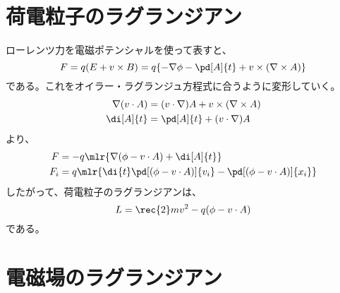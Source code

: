     \section{荷電粒子のラグランジアン}
        ローレンツ力を電磁ポテンシャルを使って表すと、
            \[F = q(E + v\times B) = q\{-\nabla\phi - \pd[A]{t} + v\times (\nabla \times A)\}\]
        である。これをオイラー・ラグランジュ方程式に合うように変形していく。
        \begin{align*}
            \nabla(v\cdot A) &= (v\cdot \nabla)A + v\times (\nabla \times A)\\
            \di[A]{t} &= \pd[A]{t} + (v\cdot \nabla)A\\
        \end{align*}
        より、
        \begin{align*}
            F &= -q\mlr{\nabla(\phi-v\cdot A) + \di[A]{t}}\\
            F_i &= q\mlr{\di{t}\pd[(\phi - v\cdot A)]{v_i} - \pd[(\phi - v\cdot A)]{x_i}}\\
        \end{align*}
        したがって、荷電粒子のラグランジアンは、
            \[L = \rec{2}mv^2 - q(\phi - v\cdot A)\]
        である。
    \section{電磁場のラグランジアン}